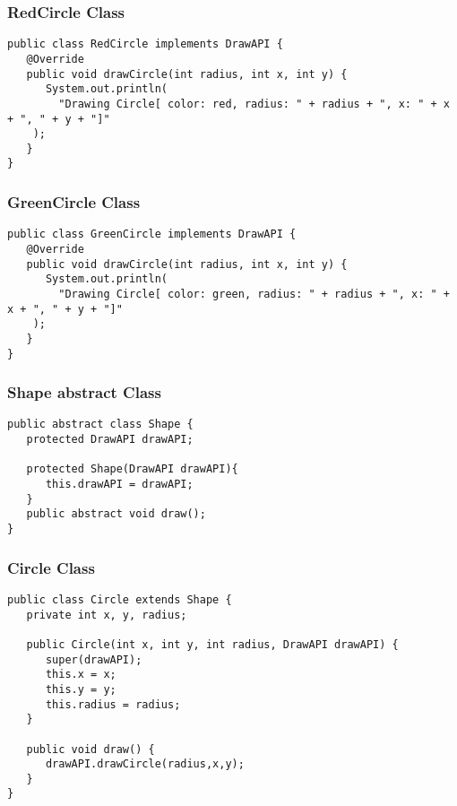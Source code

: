 \subsubsection{RedCircle Class}

\begin{verbatim}
public class RedCircle implements DrawAPI {
   @Override
   public void drawCircle(int radius, int x, int y) {
      System.out.println(
		"Drawing Circle[ color: red, radius: " + radius + ", x: " + x + ", " + y + "]"
	);
   }
}
\end{verbatim}

\subsubsection{GreenCircle Class}

\begin{verbatim}
public class GreenCircle implements DrawAPI {
   @Override
   public void drawCircle(int radius, int x, int y) {
      System.out.println(
		"Drawing Circle[ color: green, radius: " + radius + ", x: " + x + ", " + y + "]"
	);
   }
}
\end{verbatim}

\subsubsection{Shape abstract Class}

\begin{verbatim}
public abstract class Shape {
   protected DrawAPI drawAPI;
   
   protected Shape(DrawAPI drawAPI){
      this.drawAPI = drawAPI;
   }
   public abstract void draw();	
}
\end{verbatim}

\subsubsection{Circle Class}

\begin{verbatim}
public class Circle extends Shape {
   private int x, y, radius;

   public Circle(int x, int y, int radius, DrawAPI drawAPI) {
      super(drawAPI);
      this.x = x;  
      this.y = y;  
      this.radius = radius;
   }

   public void draw() {
      drawAPI.drawCircle(radius,x,y);
   }
}
\end{verbatim}

